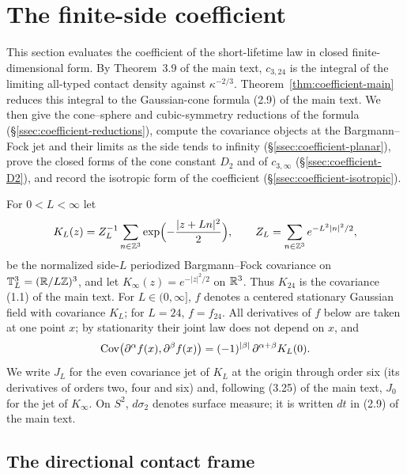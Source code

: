\section{The finite-side coefficient}\label{sec:coefficient}

This section evaluates the coefficient of the short-lifetime law in closed finite-dimensional form. By Theorem~3.9 of the main text, $c_{3,24}$ is the integral of the limiting all-typed contact density against $\kappa^{-2/3}$. Theorem~\ref{thm:coefficient-main} reduces this integral to the Gaussian-cone formula (2.9) of the main text. We then give the cone--sphere and cubic-symmetry reductions of the formula (\S\ref{ssec:coefficient-reductions}), compute the covariance objects at the Bargmann--Fock jet and their limits as the side tends to infinity (\S\ref{ssec:coefficient-planar}), prove the closed forms of the cone constant $D_2$ and of $c_{3,\infty}$ (\S\ref{ssec:coefficient-D2}), and record the isotropic form of the coefficient (\S\ref{ssec:coefficient-isotropic}).

\begin{convention}\label{conv:coefficient-kernels}
For $0<L<\infty$ let
\begin{equation}\label{eq:coefficient-KL}
K_L(z)=Z_L^{-1}\sum_{n\in\mathbb Z^3}\exp\Bigl(-\frac{|z+Ln|^2}{2}\Bigr),\qquad Z_L=\sum_{n\in\mathbb Z^3}e^{-L^2|n|^2/2},
\end{equation}
be the normalized side-$L$ periodized Bargmann--Fock covariance on $\mathbb T_L^3=(\mathbb R/L\mathbb Z)^3$, and let $K_\infty(z)=e^{-|z|^2/2}$ on $\mathbb R^3$. Thus $K_{24}$ is the covariance (1.1) of the main text. For $L\in(0,\infty]$, $f$ denotes a centered stationary Gaussian field with covariance $K_L$; for $L=24$, $f=f_{24}$. All derivatives of $f$ below are taken at one point $x$; by stationarity their joint law does not depend on $x$, and
\begin{equation}\label{eq:coefficient-covformula}
\operatorname{Cov}\bigl(\partial^\alpha f(x),\partial^\beta f(x)\bigr)=(-1)^{|\beta|}\,\partial^{\alpha+\beta}K_L(0).
\end{equation}
We write $J_L$ for the even covariance jet of $K_L$ at the origin through order six (its derivatives of orders two, four and six) and, following (3.25) of the main text, $J_0$ for the jet of $K_\infty$. On $S^2$, $d\sigma_2$ denotes surface measure; it is written $dt$ in (2.9) of the main text.
\end{convention}

\subsection{The directional contact frame}\label{ssec:coefficient-frame}

